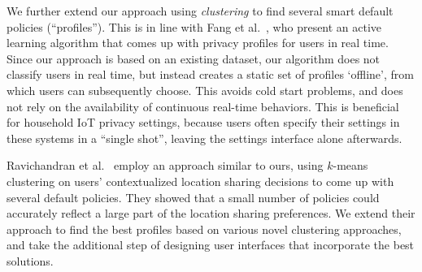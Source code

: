 We further extend our approach using \emph{clustering} to find several smart default policies (``profiles''). This is in line with Fang et al.~\cite{fang2010privacy}, who present an active learning algorithm that comes up with privacy profiles for users in real time. Since our approach is based on an existing dataset, our algorithm does not classify users in real time, but instead creates a static set of profiles `offline', from which users can subsequently choose. This avoids cold start problems, and does not rely on the availability of continuous real-time behaviors. This is beneficial for household IoT privacy settings, because users often specify their settings in these systems in a ``single shot'', leaving the settings interface alone afterwards.

Ravichandran et al.~\cite{ravichandran2009capturing} employ an approach similar to ours, using $k$-means clustering on users' contextualized location sharing decisions to come up with several default policies. They showed that a small number of policies could accurately reflect a large part of the location sharing preferences. We extend their approach to find the best profiles based on various novel clustering approaches, and take the additional step of designing user interfaces that incorporate the best solutions.


